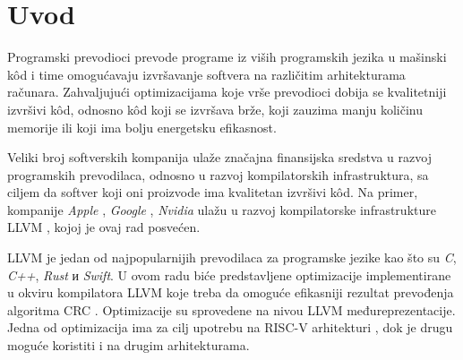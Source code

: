 \documentclass[12pt,oneside]{memoir}
\begin{document}
\frontmatter
\naslovna
\komisija
\apstrakt
\tableofcontents*

\mainmatter

\chapter{Uvod}
\label{chap:uvod}

Programski prevodioci prevode programe iz viših programskih jezika u mašinski k\^od i time omogućavaju izvršavanje softvera na različitim arhitekturama računara. Zahvaljujući optimizacijama koje vrše prevodioci dobija se kvalitetniji izvršivi k\^od, odnosno k\^od koji se izvršava brže, koji zauzima manju količinu memorije ili koji ima bolju energetsku efikasnost. 

Veliki broj softverskih kompanija ulaže značajna finansijska sredstva u razvoj programskih prevodilaca, odnosno u razvoj kompilatorskih infrastruktura, sa ciljem da softver koji oni proizvode ima kvalitetan izvršivi k\^od.
Na primer, kompanije \textit{Apple} \cite{apple}, \textit{Google} \cite{google}, \textit{Nvidia} \cite{nvidia} ulažu u razvoj kompilatorske infrastrukture LLVM \cite{llvm}, kojoj je ovaj rad posvećen. 

LLVM je jedan od najpopularnijih prevodilaca za programske jezike kao što su  \textit{C}, \textit{C++}, \textit{Rust} и \textit{Swift}.
U ovom radu biće predstavljene optimizacije implementirane u okviru kompilatora LLVM koje treba da omoguće efikasniji rezultat prevođenja algoritma CRC \cite{what_is_crc}. Optimizacije su sprovedene na nivou LLVM međureprezentacije. Jedna od optimizacija ima za cilj upotrebu na RISC-V arhitekturi \cite{what_is_riscv}, dok je drugu moguće koristiti i na drugim arhitekturama.
\end{document}
